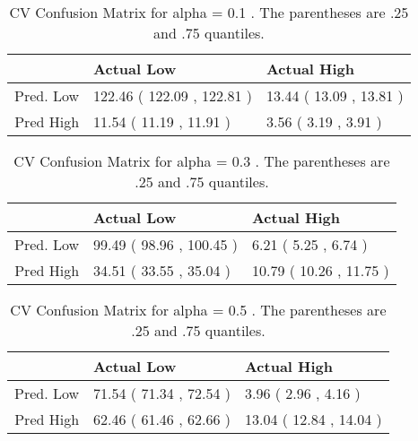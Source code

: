 \begin{table}[H]
\begin{center}
\begin{tabular}{rll}
  \hline
 & Actual Low & Actual High \\ 
  \hline
Pred. Low & 122.46 ( 122.09 , 122.81 ) & 13.44 ( 13.09 , 13.81 ) \\ 
  Pred High & 11.54 ( 11.19 , 11.91 ) & 3.56 ( 3.19 , 3.91 ) \\ 
   \hline
\end{tabular}
\caption{CV Confusion Matrix for alpha = 0.1 . The parentheses are .25 and .75 quantiles.}
\end{center}
\end{table}
\begin{table}[H]
\begin{center}
\begin{tabular}{rll}
  \hline
 & Actual Low & Actual High \\ 
  \hline
Pred. Low & 99.49 ( 98.96 , 100.45 ) & 6.21 ( 5.25 , 6.74 ) \\ 
  Pred High & 34.51 ( 33.55 , 35.04 ) & 10.79 ( 10.26 , 11.75 ) \\ 
   \hline
\end{tabular}
\caption{CV Confusion Matrix for alpha = 0.3 . The parentheses are .25 and .75 quantiles.}
\end{center}
\end{table}
\begin{table}[H]
\begin{center}
\begin{tabular}{rll}
  \hline
 & Actual Low & Actual High \\ 
  \hline
Pred. Low & 71.54 ( 71.34 , 72.54 ) & 3.96 ( 2.96 , 4.16 ) \\ 
  Pred High & 62.46 ( 61.46 , 62.66 ) & 13.04 ( 12.84 , 14.04 ) \\ 
   \hline
\end{tabular}
\caption{CV Confusion Matrix for alpha = 0.5 . The parentheses are .25 and .75 quantiles.}
\end{center}
\end{table}
